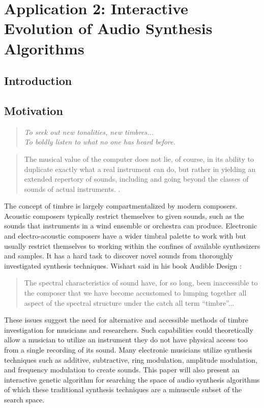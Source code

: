 \documentclass[12pt]{article}
\begin{document}
\section{Application 2: Interactive Evolution of Audio Synthesis Algorithms}
\subsection{Introduction}\label{IGAINTRO}
\subsection{Motivation}\label{IGAMOTIVATION}
\begin{quote}
\emph{To seek out new tonalities, new timbres... \\
To boldly listen to what no one has heard before.} \citep{sethares2004tuning}
\end{quote}
\begin{quote}
The musical value of the computer does not lie, of course, in its ability to duplicate exactly what a real instrument can do, but rather in yielding an extended repertory of sounds, including and going beyond the classes of sounds of actual instruments. \citep{risset1969analysis}.
\end{quote}

The concept of timbre is largely compartmentalized by modern composers. Acoustic composers typically restrict themselves to given sounds, such as the sounds that instruments in a wind ensemble or orchestra can produce. Electronic and electro-acoustic composers have a wider timbral palette to work with but usually restrict themselves to working within the confines of available synthesizers and samples. It has a hard task to discover novel sounds from thoroughly investigated synthesis techniques. Wishart said in his book Audible Design \citep{wishart1994audible}:
\begin{quote}
The spectral characteristics of sound have, for so long, been inaccessible to the composer that we have become accustomed to lumping together all aspect of the spectral structure under the catch all term ``timbre''...
\end{quote}	 
These issues suggest the need for alternative and accessible methods of timbre investigation for musicians and researchers. Such capabilities could theoretically allow a musician to utilize an instrument they do not have physical access too from a single recording of its sound. Many electronic musicians utilize synthesis techniques such as additive, subtractive, ring modulation, amplitude modulation, and frequency modulation to create sounds. This paper will also present an interactive genetic algorithm for searching the space of audio synthesis algorithms of which these traditional synthesis techniques are a minuscule subset of the search space.
\end{document}
